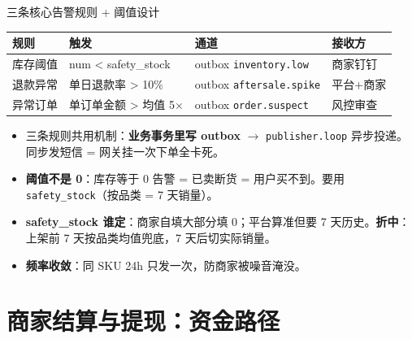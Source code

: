 \begin{frame}{三条核心告警规则 + 阈值设计}
\scriptsize
\begin{tabular}{@{}llll@{}}
\toprule
规则 & 触发 & 通道 & 接收方 \\
\midrule
库存阈值 & num < safety\_stock        & outbox \texttt{inventory.low}  & 商家钉钉 \\
退款异常 & 单日退款率 > 10\%          & outbox \texttt{aftersale.spike}& 平台+商家 \\
异常订单 & 单订单金额 > 均值 5$\times$ & outbox \texttt{order.suspect}  & 风控审查 \\
\bottomrule
\end{tabular}
\vspace{1mm}
\small
\begin{itemize}
  \item 三条规则共用机制：\textbf{业务事务里写 outbox} $\to$ \texttt{publisher.loop} 异步投递。同步发短信 = 网关挂一次下单全卡死。
  \item \textbf{阈值不是 0}：库存等于 0 告警 = 已卖断货 = 用户买不到。要用 \texttt{safety\_stock}（按品类 = 7 天销量）。
  \item \textbf{safety\_stock 谁定}：商家自填大部分填 0；平台算准但要 7 天历史。\textbf{折中}：上架前 7 天按品类均值兜底，7 天后切实际销量。
  \item \textbf{频率收敛}：同 SKU 24h 只发一次，防商家被噪音淹没。
\end{itemize}
\end{frame}

\section{商家结算与提现：资金路径}

